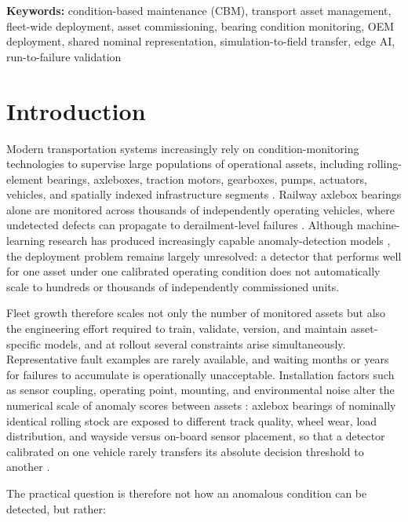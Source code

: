 \documentclass{trbunofficial}
\begin{document}
\noindent\textbf{Keywords:}
condition-based maintenance (CBM),
transport asset management,
fleet-wide deployment,
asset commissioning,
bearing condition monitoring,
OEM deployment,
shared nominal representation,
simulation-to-field transfer,
edge AI,
run-to-failure validation


\section{Introduction}
\label{sec:introduction}

Modern transportation systems increasingly rely on condition-monitoring technologies to supervise
large populations of operational assets, including rolling-element bearings, axleboxes, traction
motors, gearboxes, pumps, actuators, vehicles, and spatially indexed infrastructure segments
\citep{jardine2006,zhao2019}. Railway axlebox bearings alone are monitored across thousands of
independently operating vehicles, where undetected defects can propagate to derailment-level
failures \citep{entezami2020}. Although machine-learning research has produced increasingly
capable anomaly-detection models \citep{chandola2009,zhao2019}, the deployment problem remains
largely unresolved: a detector that performs well for one asset under one calibrated operating
condition does not automatically scale to hundreds or thousands of independently commissioned
units.

Fleet growth therefore scales not only the number of monitored assets but also the engineering
effort required to train, validate, version, and maintain asset-specific models, and at rollout
several constraints arise simultaneously. Representative fault examples are rarely available, and
waiting months or years for failures to accumulate is operationally unacceptable. Installation
factors such as sensor coupling, operating point, mounting, and environmental noise alter the
numerical scale of anomaly scores between assets \citep{randall2011}: axlebox bearings of
nominally identical rolling stock are exposed to different track quality, wheel wear, load
distribution, and wayside versus on-board sensor placement, so that a detector calibrated on one
vehicle rarely transfers its absolute decision threshold to another \citep{entezami2020}.

The practical question is therefore not how an anomalous condition can be detected, but rather:
\end{document}
